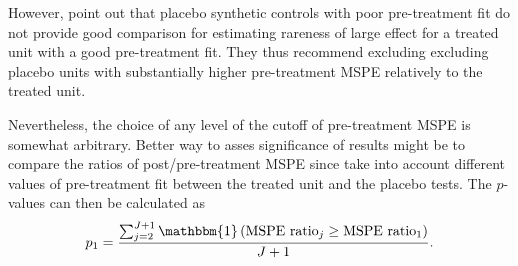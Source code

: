 
However, \citet{abadie_synthetic_2010}  point out that placebo synthetic controls with poor pre-treatment fit do not provide good comparison for estimating rareness of large effect for a treated unit with a good  pre-treatment fit. They thus recommend excluding excluding placebo units with substantially higher pre-treatment MSPE relatively to the treated unit. 

Nevertheless, the choice of any level of the cutoff of pre-treatment MSPE is somewhat arbitrary. Better way to asses significance of results might be to compare the ratios of post/pre-treatment MSPE since
take into account different values of pre-treatment fit between the treated unit and the placebo tests. The  $p$-values can then be calculated as 
\begin{equation} \label{eq:p_ratio}
 p_1   = \frac{\sum_{j = 2}^{J + 1} \mathbbm{1}\left( \text{MSPE ratio}_{j} \geq \text{MSPE ratio}_{1} \right)}{J + 1}.
\end{equation}







